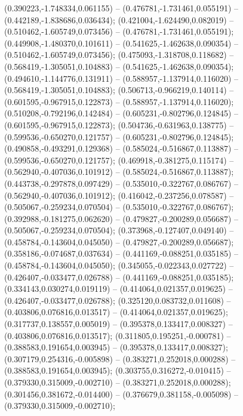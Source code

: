  (0.390223,-1.748334,0.061155) -- (0.476781,-1.731461,0.055191) -- (0.442189,-1.838686,0.036434);
 (0.421004,-1.624490,0.082019) -- (0.510462,-1.605749,0.073456) -- (0.476781,-1.731461,0.055191);
 (0.449908,-1.480370,0.101611) -- (0.541625,-1.462638,0.090354) -- (0.510462,-1.605749,0.073456);
 (0.475093,-1.318708,0.118682) -- (0.568419,-1.305051,0.104883) -- (0.541625,-1.462638,0.090354);
 (0.494610,-1.144776,0.131911) -- (0.588957,-1.137914,0.116020) -- (0.568419,-1.305051,0.104883);
 (0.506713,-0.966219,0.140114) -- (0.601595,-0.967915,0.122873) -- (0.588957,-1.137914,0.116020);
 (0.510208,-0.792196,0.142484) -- (0.605231,-0.802796,0.124845) -- (0.601595,-0.967915,0.122873);
 (0.504736,-0.631963,0.138775) -- (0.599536,-0.650270,0.121757) -- (0.605231,-0.802796,0.124845);
 (0.490858,-0.493291,0.129368) -- (0.585024,-0.516867,0.113887) -- (0.599536,-0.650270,0.121757);
 (0.469918,-0.381275,0.115174) -- (0.562940,-0.407036,0.101912) -- (0.585024,-0.516867,0.113887);
 (0.443738,-0.297878,0.097429) -- (0.535010,-0.322767,0.086767) -- (0.562940,-0.407036,0.101912);
 (0.416042,-0.237256,0.078587) -- (0.505067,-0.259234,0.070504) -- (0.535010,-0.322767,0.086767);
 (0.392988,-0.181275,0.062620) -- (0.479827,-0.200289,0.056687) -- (0.505067,-0.259234,0.070504);
 (0.373968,-0.127407,0.049140) -- (0.458784,-0.143604,0.045050) -- (0.479827,-0.200289,0.056687);
 (0.358186,-0.074687,0.037634) -- (0.441169,-0.088251,0.035185) -- (0.458784,-0.143604,0.045050);
 (0.345055,-0.022343,0.027722) -- (0.426407,-0.033477,0.026788) -- (0.441169,-0.088251,0.035185);
 (0.334143,0.030274,0.019119) -- (0.414064,0.021357,0.019625) -- (0.426407,-0.033477,0.026788);
 (0.325120,0.083732,0.011608) -- (0.403806,0.076816,0.013517) -- (0.414064,0.021357,0.019625);
 (0.317737,0.138557,0.005019) -- (0.395378,0.133417,0.008327) -- (0.403806,0.076816,0.013517);
 (0.311805,0.195251,-0.000781) -- (0.388583,0.191654,0.003945) -- (0.395378,0.133417,0.008327);
 (0.307179,0.254316,-0.005898) -- (0.383271,0.252018,0.000288) -- (0.388583,0.191654,0.003945);
 (0.303755,0.316272,-0.010415) -- (0.379330,0.315009,-0.002710) -- (0.383271,0.252018,0.000288);
 (0.301456,0.381672,-0.014400) -- (0.376679,0.381158,-0.005098) -- (0.379330,0.315009,-0.002710);
